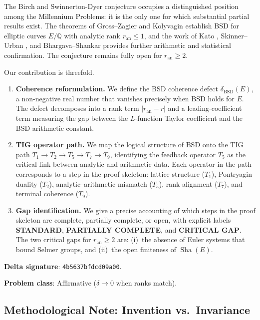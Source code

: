 \documentclass[11pt]{article}
\DeclareMathOperator{\Sha}{Sha}
\begin{document}
The Birch and Swinnerton-Dyer conjecture occupies a distinguished position
among the Millennium Problems: it is the only one for which substantial partial
results exist.  The theorems of Gross--Zagier \cite{GZ} and Kolyvagin
\cite{Koly} establish BSD for elliptic curves $E/\mathbb{Q}$ with analytic rank
$r_{\mathrm{an}} \leq 1$, and the work of Kato \cite{Kato}, Skinner--Urban
\cite{SU}, and Bhargava--Shankar \cite{BS} provides further arithmetic and
statistical confirmation.  The conjecture remains fully open for
$r_{\mathrm{an}} \geq 2$.

Our contribution is threefold.

\begin{enumerate}
  \item \textbf{Coherence reformulation.}  We define the BSD coherence defect
    $\delta_{\mathrm{BSD}}(E)$, a non-negative real number that vanishes
    precisely when BSD holds for $E$.  The defect decomposes into a rank term
    $|r_{\mathrm{an}} - r|$ and a leading-coefficient term measuring the gap
    between the $L$-function Taylor coefficient and the BSD arithmetic constant.

  \item \textbf{TIG operator path.}  We map the logical structure of BSD onto
    the TIG path $T_1 \to T_2 \to T_5 \to T_7 \to T_9$, identifying the
    feedback operator $T_5$ as the critical link between analytic and arithmetic
    data.  Each operator in the path corresponds to a step in the proof
    skeleton: lattice structure ($T_1$), Pontryagin duality ($T_2$),
    analytic--arithmetic mismatch ($T_5$), rank alignment ($T_7$), and terminal
    coherence ($T_9$).

  \item \textbf{Gap identification.}  We give a precise accounting of which
    steps in the proof skeleton are complete, partially complete, or open, with
    explicit labels \textbf{STANDARD}, \textbf{PARTIALLY COMPLETE}, and
    \textbf{CRITICAL GAP}.  The two critical gaps for $r_{\mathrm{an}} \geq 2$
    are: (i)~the absence of Euler systems that bound Selmer groups, and
    (ii)~the open finiteness of $\Sha(E)$.
\end{enumerate}

\noindent
\textbf{Delta signature}: \texttt{4b5637bfdcd09a00}.

\noindent
\textbf{Problem class}: Affirmative ($\delta \to 0$ when ranks match).

\subsection*{Methodological Note: Invention vs.\ Invariance}
\end{document}
